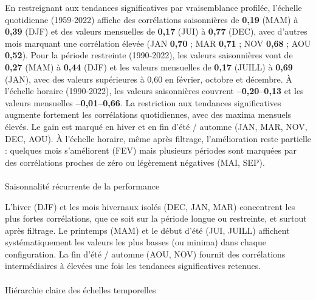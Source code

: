 \documentclass[
  article,
  nofooter,
  noheadings]{jss}
\makeatletter
\let\oldparagraph\paragraph
\renewcommand{\paragraph}{
    \@ifstar
      \xxxParagraphStar
      \xxxParagraphNoStar
  }
\newcommand{\xxxParagraphStar}[1]{\oldparagraph*{#1}\mbox{}}
\newcommand{\xxxParagraphNoStar}[1]{\oldparagraph{#1}\mbox{}}
\makeatother
\begin{document}

\hfill\break

En restreignant aux tendances significatives par vraisemblance profilée,
l'échelle quotidienne (1959‑2022) affiche des corrélations saisonnières
de \textbf{0,19} (MAM) à \textbf{0,39} (DJF) et des valeurs mensuelles
de \textbf{0,17} (JUI) à \textbf{0,77} (DEC), avec d'autres mois
marquant une corrélation élevée (JAN \textbf{0,70} ; MAR \textbf{0,71} ;
NOV \textbf{0,68} ; AOU \textbf{0,52}). Pour la période restreinte
(1990‑2022), les valeurs saisonnières vont de \textbf{0,27} (MAM) à
\textbf{0,44} (DJF) et les valeurs mensuelles de \textbf{0,17} (JUILL) à
\textbf{0,69} (JAN), avec des valeurs supérieures à 0,60 en février,
octobre et décembre. À l'échelle horaire (1990‑2022), les valeurs
saisonnières couvrent \textbf{--0,20--0,13} et les valeurs mensuelles
\textbf{--0,01--0,66}. La restriction aux tendances significatives
augmente fortement les corrélations quotidiennes, avec des maxima
mensuels élevés. Le gain est marqué en hiver et en fin d'été / automne
(JAN, MAR, NOV, DEC, AOU). À l'échelle horaire, même après filtrage,
l'amélioration reste partielle : quelques mois s'améliorent (FEV) mais
plusieurs périodes sont marquées par des corrélations proches de zéro ou
légèrement négatives (MAI, SEP).

\paragraph{Saisonnalité récurrente de la
performance}\label{saisonnalituxe9-ruxe9currente-de-la-performance}

L'hiver (DJF) et les mois hivernaux isolés (DEC, JAN, MAR) concentrent
les plus fortes corrélations, que ce soit sur la période longue ou
restreinte, et surtout après filtrage. Le printemps (MAM) et le début
d'été (JUI, JUILL) affichent systématiquement les valeurs les plus
basses (ou minima) dans chaque configuration. La fin d'été / automne
(AOU, NOV) fournit des corrélations intermédiaires à élevées une fois
les tendances significatives retenues.

\paragraph{Hiérarchie claire des échelles
temporelles}\label{hiuxe9rarchie-claire-des-uxe9chelles-temporelles}
\end{document}
